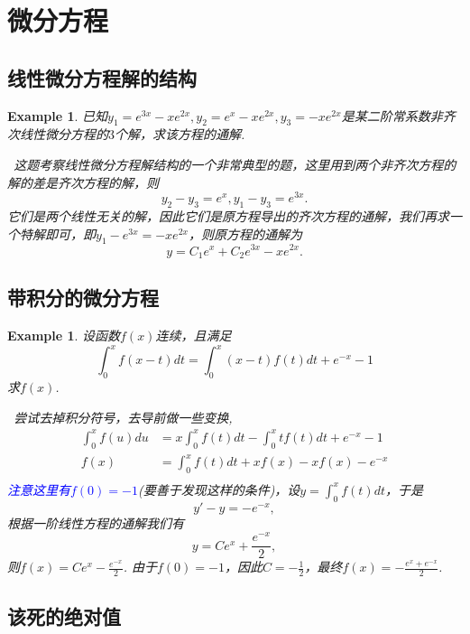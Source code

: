 \documentclass{article}
\newtheorem{example}[theorem]{Example}
\newcommand{\hints}{{\color{blue} \text{hints}}}
\newcommand{\bluet}[1]{\textcolor{blue}{#1}}
\begin{document}
\newpage
\section{微分方程}

\subsection{线性微分方程解的结构}

\begin{example}
\rm 已知$y_1 = e^{3x}-xe^{2x},y_2 = e^x - xe^{2x},y_3 = -xe^{2x}$是某二阶常系数非齐次线性微分方程的$3$个解，求该方程的通解.

\hints\ 这题考察线性微分方程解结构的一个非常典型的题，这里用到两个非齐次方程的解的差是齐次方程的解，则
$$
y_2  - y_3 = e^x , y_1 - y_3 = e^{3x}.
$$
它们是两个线性无关的解，因此它们是原方程导出的齐次方程的通解，我们再求一个特解即可，即$y_1-e^{3x} = -xe^{2x}$，则原方程的通解为
$$
y=C_1e^x + C_2e^{3x}-xe^{2x}. 
$$
\end{example}

\subsection{带积分的微分方程}

\begin{example}
\rm 设函数$f(x)$连续，且满足
$$
\int_0^x f(x-t)dt = \int_0^x (x-t)f(t)dt +e^{-x}-1
$$
求$f(x)$.

\hints\ 尝试去掉积分符号，去导前做一些变换,
$$
\begin{array}{rl}
\int_0^x f(u)du &= x\int_0^x f(t)dt - \int_0^x tf(t)dt + e^{-x}-1 \\
f(x) &= \int_0^x f(t)dt + xf(x)-xf(x)-e^{-x} \\
\end{array}
$$
\bluet{注意这里有$f(0)=-1$}(要善于发现这样的条件)，设$y = \int_0^x f(t)dt$，于是
$$
y'-y = -e^{-x},
$$
根据一阶线性方程的通解我们有
$$
y = Ce^x + \frac{e^{-x}}{2},
$$
则$f(x) = Ce^x -\frac{e^{-x}}{2}$. 由于$f(0)=-1$，因此$C=-\frac{1}{2}$，最终$f(x)= -\frac{e^{x}+e^{-x}}{2}$. 
\end{example}

\newpage
\subsection{该死的绝对值}
\end{document}
